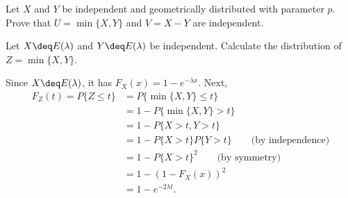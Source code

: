 \begin{exercise}
  Let $X$ and $Y$ be independent and geometrically distributed with parameter $p$. Prove that $U=\min\{X,Y\}$ and $V=X-Y$ are independent.
\end{exercise}
\begin{solution}
  [TODO]
\end{solution}


\begin{exercise}
  Let $X\deq E(\lambda)$ and $Y\deq E(\lambda)$ be independent. Calculate the distribution of $Z=\min\{X,Y\}$.
\end{exercise}
\begin{solution}
  Since $X\deq E(\lambda)$, it has $F_X(x)=1-e^{-\lambda x}$. Next,
  \begin{align*}
    F_Z(t) = P\{Z\leq t\} &= P\{\min\{X,Y\}\leq t\} \\
      &= 1 - P\{\min\{X,Y\}> t\} \\
      &= 1 - P\{X>t, Y>t\} \\
      &= 1 - P\{X>t\}P\{Y>t\} \qquad\mbox{(by independence)} \\
      &= 1 - P\{X>t\}^2 \qquad\mbox{(by symmetry)} \\
      &= 1 - (1-F_X(x))^2 \\
      &= 1 - e^{-2\lambda t} .
  \end{align*}
\end{solution}
